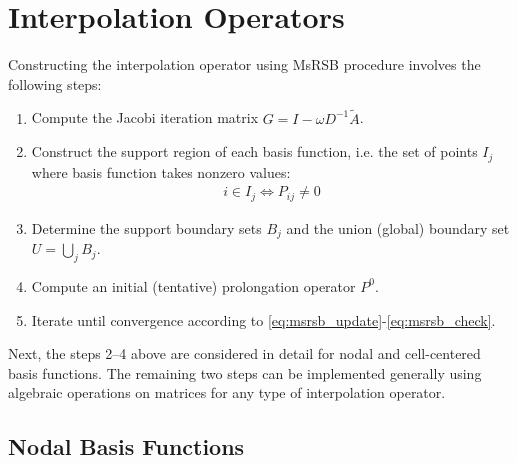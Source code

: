 \section{Interpolation Operators}
\label{sec:msrsb_interpolation} 

Constructing the interpolation operator using MsRSB procedure involves the following steps:
\begin{enumerate}
    \item \label{itm:msrsb_step_matrix} Compute the Jacobi iteration matrix $G = I - \omega D^{-1} \tilde{A}$.
    \item \label{itm:msrsb_step_support} Construct the support region of each basis function, i.e. the set of points $I_j$ where basis function takes nonzero values:
    \begin{align}
        i \in I_j \iff P_{ij} \neq 0
    \end{align}
    \item \label{itm:msrsb_step_boundaries} Determine the support boundary sets $B_j$ and the union (global) boundary set $U = \bigcup\limits_{j} B_j$.
    \item \label{itm:msrsb_step_initp} Compute an initial (tentative) prolongation operator $P^0$.
    \item \label{itm:msrsb_step_iterate} Iterate until convergence according to \eqref{eq:msrsb_update}-\eqref{eq:msrsb_check}.
\end{enumerate}
Next, the steps 2--4 above are considered in detail for nodal and cell-centered basis functions. The remaining two steps can be implemented generally using algebraic operations on matrices for any type of interpolation operator.

\subsection{Nodal Basis Functions}
\label{subsec:msrsb_nodal_basis}

